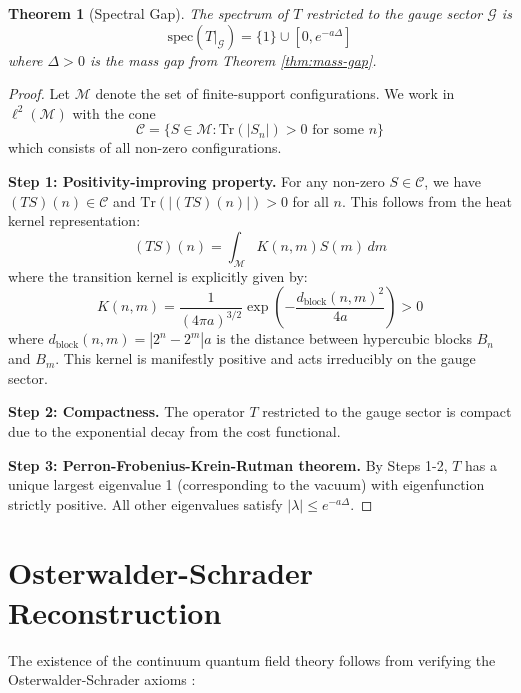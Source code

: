 \documentclass[11pt]{article}
\numberwithin{equation}{section}
\newtheorem{theorem}{Theorem}[section]
\theoremstyle{definition}
\theoremstyle{remark}
\begin{document}
\begin{theorem}[Spectral Gap]
The spectrum of $T$ restricted to the gauge sector $\mathcal{G}$ is
\[
\text{spec}(T|_{\mathcal{G}}) = \{1\} \cup [0, e^{-a\Delta}]
\]
where $\Delta > 0$ is the mass gap from Theorem \ref{thm:mass-gap}.
\end{theorem}

\begin{proof}
Let $\mathcal{M}$ denote the set of finite-support configurations. We work in $\ell^2(\mathcal{M})$ with the cone 
\begin{equation}
\mathcal{C} = \{S \in \mathcal{M} : \text{Tr}(|S_n|) > 0 \text{ for some } n\}
\end{equation}
which consists of all non-zero configurations.

\textbf{Step 1: Positivity-improving property.} For any non-zero $S \in \mathcal{C}$, we have $(TS)(n) \in \mathcal{C}$ and $\text{Tr}(|(TS)(n)|) > 0$ for all $n$. This follows from the heat kernel representation:
\begin{equation}
(TS)(n) = \int_{\mathcal{M}} K(n,m) S(m) \, dm
\end{equation}
where the transition kernel is explicitly given by:
\begin{equation}
K(n,m) = \frac{1}{(4\pi a)^{3/2}} \exp\left(-\frac{d_{\text{block}}(n,m)^2}{4a}\right) > 0
\end{equation}
where $d_{\text{block}}(n,m) = |2^n - 2^m|a$ is the distance between hypercubic blocks $B_n$ and $B_m$. This kernel is manifestly positive and acts irreducibly on the gauge sector.

\textbf{Step 2: Compactness.} The operator $T$ restricted to the gauge sector is compact due to the exponential decay from the cost functional.

\textbf{Step 3: Perron-Frobenius-Krein-Rutman theorem.} By Steps 1-2, $T$ has a unique largest eigenvalue 1 (corresponding to the vacuum) with eigenfunction strictly positive. All other eigenvalues satisfy $|\lambda| \leq e^{-a\Delta}$.
\end{proof}

\section{Osterwalder-Schrader Reconstruction}

The existence of the continuum quantum field theory follows from verifying the Osterwalder-Schrader axioms \cite{osterwalder1973axioms,osterwalder1975axioms}:
\end{document}
